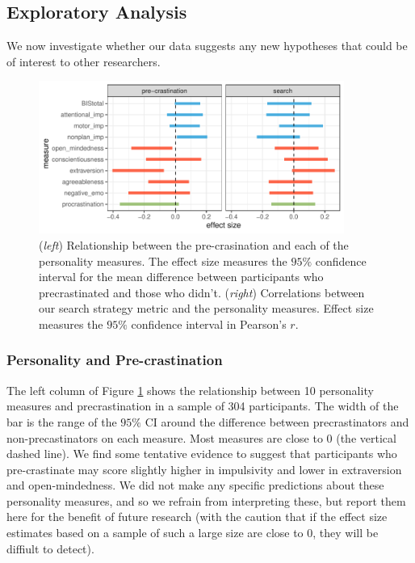 \documentclass[]{rsos}
\begin{document}
\subsection{Exploratory Analysis}

We now investigate whether our data suggests any new hypotheses that could be of interest to other researchers.  

\begin{figure}[t]
  \centering  
\includegraphics[width=10cm]{../analysis/scratch/exp_strat.pdf}
  \caption{(\textit{left}) Relationship between the pre-crasination and each of the personality measures. The effect size measures the $95\%$ confidence interval for the mean difference between participants who precrastinated and those who didn't. (\textit{right}) Correlations between our search strategy metric and the personality measures. Effect size measures the $95\%$ confidence interval in Pearson's $r$.}
   \label{fig:exp_analysis}
\end{figure}

\subsubsection{Personality and Pre-crastination}
The left column of Figure \ref{fig:exp_analysis} shows the relationship between 10 personality measures and precrastination in a sample of 304 participants. The width of the bar is the range of the $95\%$ CI around the difference between precrastinators and non-precastinators on each measure. Most measures are close to 0 (the vertical dashed line). We find some tentative evidence to suggest that participants who pre-crastinate may score slightly higher in impulsivity and lower in extraversion and open-mindedness. We did not make any specific predictions about these personality measures, and so we refrain from interpreting these, but report them here for the benefit of future research (with the caution that if the effect size estimates based on a sample of such a large size are close to 0, they will be diffiult to detect).
\end{document}
